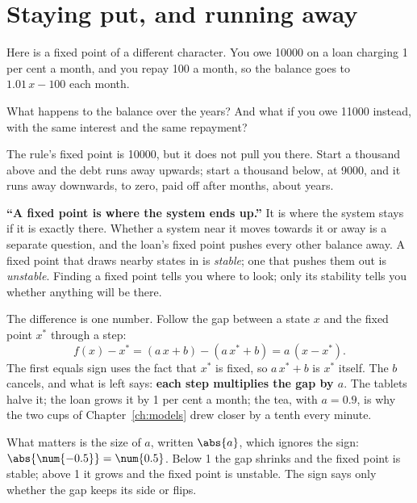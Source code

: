 \section{Staying put, and running away}
\label{sec:ch02-stability}

\noindent
Here is a fixed point of a different character. You owe \num{10000} on a
loan charging 1 per cent a month, and you repay 100 a month, so the balance
goes to $\num{1.01}\,x - 100$ each month.

\begin{think}
What happens to the balance over the years? And what if you owe
\num{11000} instead, with the same interest and the same repayment?
\end{think}
The rule's fixed point is \num{10000}, but it does not pull you there.
Start a thousand above and the debt runs away upwards; start a thousand
below, at \num{9000}, and it runs away downwards, to zero, paid off after
 months, about  years.

\begin{trapbox}
\textbf{\enquote{A fixed point is where the system ends up.}} It is where
the system stays if it is exactly there. Whether a system near it moves
towards it or away is a separate question, and the loan's fixed point
pushes every other balance away. A fixed point that draws nearby states in
is \emph{stable}; one that pushes them out is \emph{unstable}. Finding a
fixed point tells you where to look; only its stability tells you whether
anything will be there.
\end{trapbox}

\noindent
The difference is one number. Follow the gap between a state $x$ and the
fixed point $x^{*}$ through a step:
\[ f(x) - x^{*} = (a\,x + b) - (a\,x^{*} + b) = a\,(x - x^{*}) . \]
The first equals sign uses the fact that $x^{*}$ is fixed, so $a\,x^{*} +
b$ is $x^{*}$ itself. The $b$ cancels, and what is left says: \textbf{each
step multiplies the gap by $a$}. The tablets halve it; the loan grows it by
1 per cent a month; the tea, with $a = \num{0.9}$, is why the two cups of
Chapter~\ref{ch:models} drew closer by a tenth every minute.

What matters is the size of $a$, written $\abs{a}$, which ignores the
sign: $\abs{\num{-0.5}} = \num{0.5}$. Below 1 the gap shrinks and the fixed
point is stable; above 1 it grows and the fixed point is unstable. The sign
says only whether the gap keeps its side or flips.

